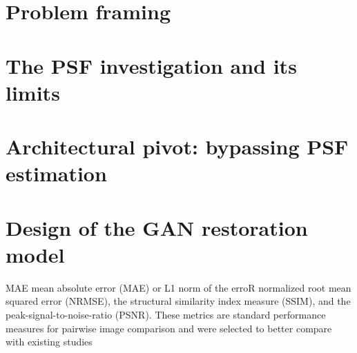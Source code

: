 \section{Problem framing}

\section{The PSF investigation and its limits}

\section{Architectural pivot: bypassing PSF estimation}

\section{Design of the GAN restoration model}

MAE
mean absolute error (MAE) or L1 norm of the erroR
normalized root mean squared error (NRMSE), the structural similarity index measure (SSIM), and the peak-signal-to-noise-ratio (PSNR). These metrics are standard performance measures for pairwise image comparison and were selected to better compare with existing studies